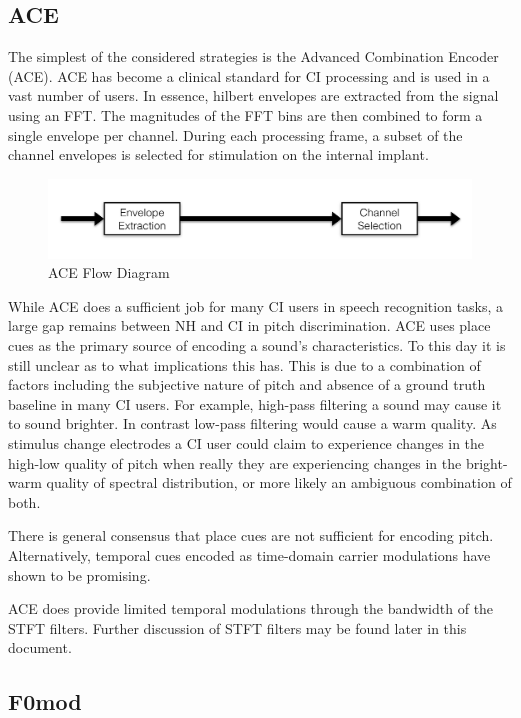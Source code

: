 \documentclass [11pt, proquest] {uwthesis}[2015/03/03]
\begin{document}
\subsection{ACE}

The simplest of the considered strategies is the Advanced Combination Encoder (ACE).  ACE has become a clinical standard for CI processing and is used in a vast number of users.  In essence, hilbert envelopes are extracted from the signal using an FFT.  The magnitudes of the FFT bins are then combined to form a single envelope per channel.  During each processing frame, a subset of the channel envelopes is selected for stimulation on the internal implant.

\begin{figure}[!ht]
  \centering
    \includegraphics[width=1\textwidth]{ACE_flow_diagramTEMP}   
    \caption{ACE Flow Diagram}
\end{figure}

While ACE does a sufficient job for many CI users in speech recognition tasks, a large gap remains between NH and CI in pitch discrimination.  ACE uses place cues as the primary source of encoding a sound's characteristics.  To this day it is still unclear as to what implications this has.  This is due to a combination of factors including the subjective nature of pitch and absence of a ground truth baseline in many CI users.  For example, high-pass filtering a sound may cause it to sound brighter.  In contrast low-pass filtering would cause a warm quality.  As stimulus change electrodes a CI user could claim to experience changes in the high-low quality of pitch when really they are experiencing changes in the bright-warm quality of spectral distribution, or more likely an ambiguous combination of both.

There is general consensus that place cues are not sufficient for encoding pitch.  Alternatively, temporal cues encoded as time-domain carrier modulations have shown to be promising.

ACE does provide limited temporal modulations through the bandwidth of the STFT filters.  Further discussion of STFT filters may be found later in this document.

\subsection{F0mod}
\end{document}
